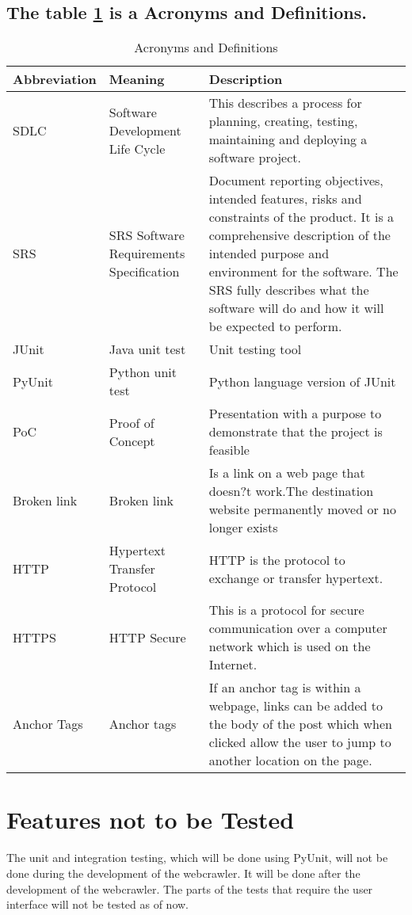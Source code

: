 \documentclass[12pt]{article}
\begin{document}
\begin{table}[h!]
\subsection{The table \ref{table:Acronyms and Definitions} is a Acronyms and Definitions.}
    \begin{tabular}{| p{5cm} | p{5cm} | p{5cm} |}    \hline
  Abbreviation&Meaning&Description\\ \hline
SDLC&Software Development Life Cycle&This describes a process for planning, creating, testing, maintaining and deploying a software project.\\ \hline
SRS&SRS Software Requirements Specification&Document reporting objectives, intended features, risks and constraints of the product. It is a comprehensive description of the intended purpose and environment for the software. The SRS fully describes what the software will do and how it will be expected to perform.\\ \hline
JUnit&Java unit test&Unit testing tool\\ \hline
PyUnit&Python unit test&Python language version of JUnit\\ \hline
PoC&Proof of Concept&Presentation with a purpose to demonstrate that the project is feasible\\ \hline
Broken link&Broken link&Is a link on a web page that doesn?t work.The destination website permanently moved or no longer exists\\ \hline
HTTP&Hypertext Transfer Protocol&HTTP is the protocol to exchange or transfer hypertext.\\ \hline
HTTPS&HTTP Secure&This is a protocol for secure communication over a computer network which is used on the Internet.\\ \hline
Anchor Tags& Anchor tags&If  an anchor tag is within a webpage, links can be added to the body of the post which when clicked allow the user to jump to another location on the page.\\ \hline

    
       \end{tabular}
    \caption{Acronyms and Definitions}
\label{table:Acronyms and Definitions}
\end{table}




\section{Features not to be Tested}
The unit and integration testing, which will be done using PyUnit, will not be done during the development of the webcrawler. It will be done after the development of the webcrawler. The parts of the tests that require the user interface will not be tested as of now.
 
\end{document}
